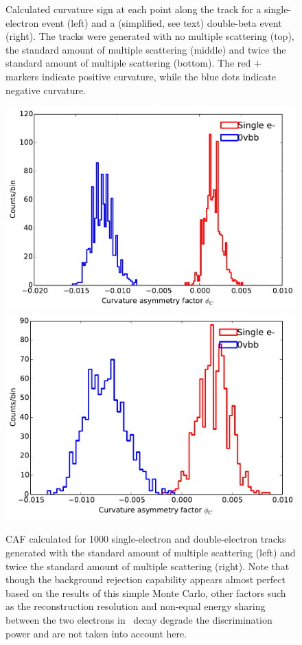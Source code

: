 \documentclass{JINST}
\begin{document}
\begin{figure}[!htb]
	\caption{\label{fig_trkcurv_cf}Calculated curvature sign at each point along the track for a single-electron event (left) and a (simplified, see text) double-beta event (right).  The tracks were generated with no multiple scattering (top), the 
	standard amount of multiple scattering (middle) and twice the standard amount of multiple scattering 
	(bottom).  The red $+$ markers indicate positive curvature, while the blue dots indicate negative curvature.}
\end{figure}

\begin{figure}[!htb]
	\includegraphics[scale=0.45]{fig/scurv_diff_means_ms13pt6.pdf}
	\includegraphics[scale=0.45]{fig/scurv_diff_means_ms27pt2.pdf}
	\caption{\label{fig_assym_cf} CAF calculated for 1000 single-electron and double-electron tracks generated with the standard amount of multiple scattering (left) and twice the standard amount of multiple scattering (right).  Note that though the background rejection capability appears almost perfect based on the results of this simple Monte Carlo, other factors such as the reconstruction resolution and non-equal energy sharing between the two electrons in \bbonu\ decay degrade the discrimination power and are not taken into account here.}
\end{figure}
\end{document}
